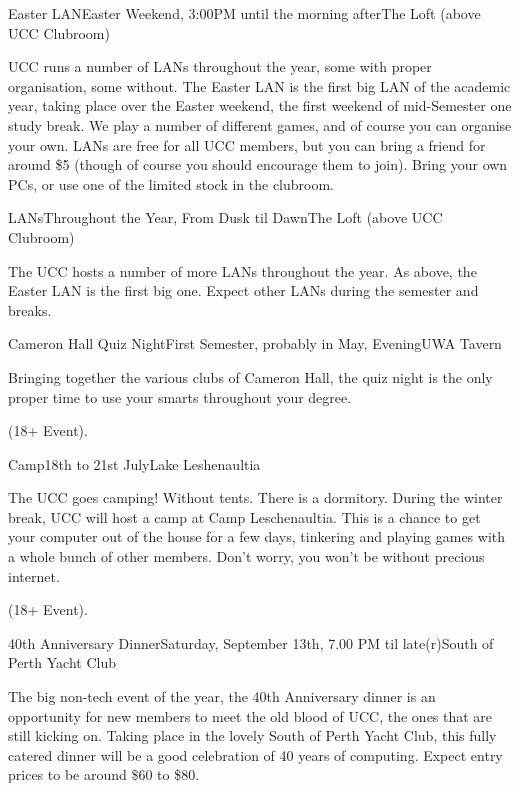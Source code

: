 \begin{event}{Easter LAN}{Easter Weekend, 3:00PM until the morning after}{The Loft (above UCC Clubroom)}

UCC runs a number of LANs throughout the year, some with proper organisation, some without. The Easter LAN is the first big LAN of the academic year, taking place over the Easter weekend, the first weekend of mid-Semester one study break. We play a number of different games, and of course you can organise your own. LANs are free for all UCC members, but you can bring a friend for around \$5 (though of course you should encourage them to join). Bring your own PCs, or use one of the limited stock in the clubroom.

\end{event}

\pagebreak
\begin{event}{LANs}{Throughout the Year, From Dusk til Dawn}{The Loft (above UCC Clubroom)}

The UCC hosts a number of more LANs throughout the year. As above, the Easter LAN is the first big one. Expect other LANs during the semester and breaks.

\end{event}

\begin{event}{Cameron Hall Quiz Night}{First Semester, probably in May, Evening}{UWA Tavern}

Bringing together the various clubs of Cameron Hall, the quiz night is the only proper time to use your smarts throughout your degree.

 (18+ Event).

\end{event}


\begin{event}{Camp}{18th to 21st July}{Lake Leshenaultia}

The UCC goes camping! Without tents. There is a dormitory. During the winter break, UCC will host a camp at Camp Leschenaultia. This is a chance to get your computer out of the house for a few days, tinkering and playing games with a whole bunch of other members. Don't worry, you won't be without precious internet.

 (18+ Event).

\end{event}



\begin{event}{40th Anniversary Dinner}{Saturday, September 13th, 7.00 PM til late(r)}{South of Perth Yacht Club}

The big non-tech event of the year, the 40th Anniversary dinner is an opportunity for new members to meet the old blood of UCC, the ones that are still kicking on. Taking place in the lovely South of Perth Yacht Club, this fully catered dinner will be a good celebration of 40 years of computing. Expect entry prices to be around \$60 to \$80.

\end{event}

